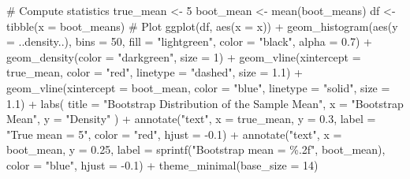 \documentclass[
  letterpaper,
  DIV=11,
  numbers=noendperiod]{scrreprt}
\newenvironment{Shaded}{\begin{snugshade}}{\end{snugshade}}
\newcommand{\AttributeTok}[1]{\textcolor[rgb]{0.40,0.45,0.13}{#1}}
\newcommand{\CommentTok}[1]{\textcolor[rgb]{0.37,0.37,0.37}{#1}}
\newcommand{\DecValTok}[1]{\textcolor[rgb]{0.68,0.00,0.00}{#1}}
\newcommand{\FloatTok}[1]{\textcolor[rgb]{0.68,0.00,0.00}{#1}}
\newcommand{\FunctionTok}[1]{\textcolor[rgb]{0.28,0.35,0.67}{#1}}
\newcommand{\NormalTok}[1]{\textcolor[rgb]{0.00,0.23,0.31}{#1}}
\newcommand{\OtherTok}[1]{\textcolor[rgb]{0.00,0.23,0.31}{#1}}
\newcommand{\SpecialCharTok}[1]{\textcolor[rgb]{0.37,0.37,0.37}{#1}}
\newcommand{\StringTok}[1]{\textcolor[rgb]{0.13,0.47,0.30}{#1}}
\begin{document}
\begin{Shaded}
\begin{Highlighting}[]
\CommentTok{\# Compute statistics}
\NormalTok{true\_mean }\OtherTok{\textless{}{-}} \DecValTok{5}
\NormalTok{boot\_mean }\OtherTok{\textless{}{-}} \FunctionTok{mean}\NormalTok{(boot\_means)}
\NormalTok{df }\OtherTok{\textless{}{-}} \FunctionTok{tibble}\NormalTok{(}\AttributeTok{x =}\NormalTok{ boot\_means)}
\CommentTok{\# Plot}
\FunctionTok{ggplot}\NormalTok{(df, }\FunctionTok{aes}\NormalTok{(}\AttributeTok{x =}\NormalTok{ x)) }\SpecialCharTok{+}
  \FunctionTok{geom\_histogram}\NormalTok{(}\FunctionTok{aes}\NormalTok{(}\AttributeTok{y =}\NormalTok{ ..density..), }\AttributeTok{bins =} \DecValTok{50}\NormalTok{, }
                 \AttributeTok{fill =} \StringTok{"lightgreen"}\NormalTok{, }\AttributeTok{color =} \StringTok{"black"}\NormalTok{, }\AttributeTok{alpha =} \FloatTok{0.7}\NormalTok{) }\SpecialCharTok{+}
  \FunctionTok{geom\_density}\NormalTok{(}\AttributeTok{color =} \StringTok{"darkgreen"}\NormalTok{, }\AttributeTok{size =} \DecValTok{1}\NormalTok{) }\SpecialCharTok{+}
  \FunctionTok{geom\_vline}\NormalTok{(}\AttributeTok{xintercept =}\NormalTok{ true\_mean, }\AttributeTok{color =} \StringTok{"red"}\NormalTok{, }\AttributeTok{linetype =} \StringTok{"dashed"}\NormalTok{, }\AttributeTok{size =} \FloatTok{1.1}\NormalTok{) }\SpecialCharTok{+}
  \FunctionTok{geom\_vline}\NormalTok{(}\AttributeTok{xintercept =}\NormalTok{ boot\_mean, }\AttributeTok{color =} \StringTok{"blue"}\NormalTok{, }\AttributeTok{linetype =} \StringTok{"solid"}\NormalTok{, }\AttributeTok{size =} \FloatTok{1.1}\NormalTok{) }\SpecialCharTok{+}
  \FunctionTok{labs}\NormalTok{(}
    \AttributeTok{title =} \StringTok{"Bootstrap Distribution of the Sample Mean"}\NormalTok{,}
    \AttributeTok{x =} \StringTok{"Bootstrap Mean"}\NormalTok{,}
    \AttributeTok{y =} \StringTok{"Density"}
\NormalTok{  ) }\SpecialCharTok{+}
  \FunctionTok{annotate}\NormalTok{(}\StringTok{"text"}\NormalTok{, }\AttributeTok{x =}\NormalTok{ true\_mean, }\AttributeTok{y =} \FloatTok{0.3}\NormalTok{, }\AttributeTok{label =} \StringTok{"True mean = 5"}\NormalTok{, }\AttributeTok{color =} \StringTok{"red"}\NormalTok{, }\AttributeTok{hjust =} \SpecialCharTok{{-}}\FloatTok{0.1}\NormalTok{) }\SpecialCharTok{+}
  \FunctionTok{annotate}\NormalTok{(}\StringTok{"text"}\NormalTok{, }\AttributeTok{x =}\NormalTok{ boot\_mean, }\AttributeTok{y =} \FloatTok{0.25}\NormalTok{, }\AttributeTok{label =} \FunctionTok{sprintf}\NormalTok{(}\StringTok{"Bootstrap mean = \%.2f"}\NormalTok{, boot\_mean),}
           \AttributeTok{color =} \StringTok{"blue"}\NormalTok{, }\AttributeTok{hjust =} \SpecialCharTok{{-}}\FloatTok{0.1}\NormalTok{) }\SpecialCharTok{+}
  \FunctionTok{theme\_minimal}\NormalTok{(}\AttributeTok{base\_size =} \DecValTok{14}\NormalTok{)}
\end{Highlighting}
\end{Shaded}
\end{document}
